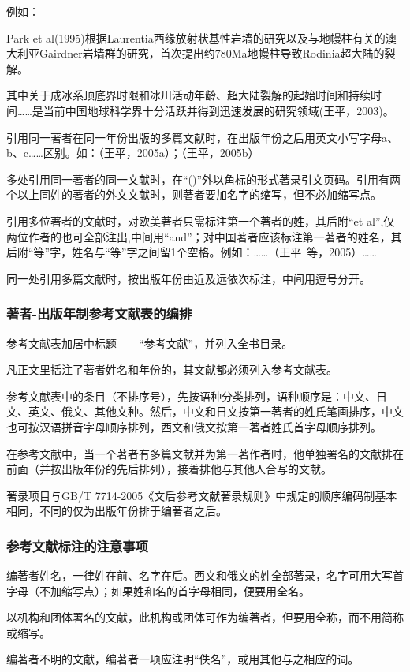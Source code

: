 例如：

Park et al(1995)根据Laurentia西缘放射状基性岩墙的研究以及与地幔柱有关的澳大利亚Gairdner岩墙群的研究，首次提出约780Ma地幔柱导致Rodinia超大陆的裂解。

其中关于成冰系顶底界时限和冰川活动年龄、超大陆裂解的起始时间和持续时间……是当前中国地球科学界十分活跃并得到迅速发展的研究领域(王平，2003)。

引用同一著者在同一年份出版的多篇文献时，在出版年份之后用英文小写字母a、b、c……区别。如：（王平，2005a）；（王平，2005b）

多处引用同一著者的同一文献时，在“()”外以角标的形式著录引文页码。引用有两个以上同姓的著者的外文文献时，则著者要加名字的缩写，但不必加缩写点。

引用多位著者的文献时，对欧美著者只需标注第一个著者的姓，其后附“et al”,仅两位作者的也可全部注出,中间用“and”；对中国著者应该标注第一著者的姓名，其后附“等”字，姓名与“等”字之间留1个空格。例如：……（王平\ 等，2005）……

同一处引用多篇文献时，按出版年份由近及远依次标注，中间用逗号分开。

\subsubsection{著者-出版年制参考文献表的编排}

参考文献表加居中标题——“参考文献”，并列入全书目录。

凡正文里括注了著者姓名和年份的，其文献都必须列入参考文献表。

参考文献表中的条目（不排序号），先按语种分类排列，语种顺序是：中文、日文、英文、俄文、其他文种。然后，中文和日文按第一著者的姓氏笔画排序，中文也可按汉语拼音字母顺序排列，西文和俄文按第一著者姓氏首字母顺序排列。

在参考文献中，当一个著者有多篇文献并为第一著作者时，他单独署名的文献排在前面（并按出版年份的先后排列），接着排他与其他人合写的文献。

著录项目与GB/T 7714-2005《文后参考文献著录规则》中规定的顺序编码制基本相同，不同的仅为出版年份排于编著者之后。
\subsubsection{参考文献标注的注意事项}
编著者姓名，一律姓在前、名字在后。西文和俄文的姓全部著录，名字可用大写首字母（不加缩写点）；如果姓和名的首字母相同，便要用全名。

以机构和团体署名的文献，此机构或团体可作为编著者，但要用全称，而不用简称或缩写。

编著者不明的文献，编著者一项应注明“佚名”，或用其他与之相应的词。

